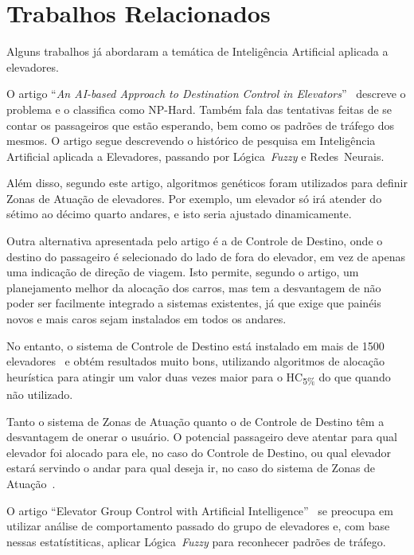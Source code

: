 \chapter{\label{chap:related}Trabalhos Relacionados}

Alguns trabalhos já abordaram a temática de Inteligência Artificial aplicada a
elevadores. %

O artigo ``\textit{An AI-based Approach to Destination Control in
  Elevators}''~\cite{KOEHLEROTTIGER02} descreve o problema e o classifica como
NP-Hard. Também fala das tentativas feitas de se contar os passageiros que estão
esperando, bem como os padrões de tráfego dos mesmos. O artigo segue descrevendo
o histórico de pesquisa em Inteligência Artificial aplicada a Elevadores,
passando por Lógica~\textit{Fuzzy} e Redes~Neurais. 

Além disso, segundo este artigo, algoritmos genéticos foram utilizados para definir Zonas de
Atuação de elevadores. Por exemplo, um elevador só irá atender do sétimo ao
décimo quarto andares, e isto seria ajustado dinamicamente.

Outra alternativa apresentada pelo artigo é a de Controle de Destino, onde o
destino do passageiro é selecionado do lado de fora do elevador, em vez de
apenas uma indicação de direção de viagem. Isto permite, segundo o artigo, um
planejamento melhor da alocação dos carros, mas tem a desvantagem de não poder
ser facilmente integrado a sistemas existentes, já que exige que painéis novos e
mais caros sejam instalados em todos os andares.

No entanto, o sistema de Controle de Destino está instalado em mais de 1500
elevadores~\cite{KOEHLEROTTIGER02} e obtém resultados muito bons, utilizando
algoritmos de alocação heurística para atingir um valor duas vezes maior para o
HC\textsubscript{5\%} do que quando não utilizado.

Tanto o sistema de Zonas de Atuação quanto o de Controle de Destino têm a
desvantagem de onerar o usuário. O potencial passageiro deve atentar para qual
elevador foi alocado para ele, no caso do Controle de Destino, ou qual elevador
estará servindo o andar para qual deseja ir, no caso do sistema de Zonas de Atuação~\cite{KOEHLEROTTIGER02}.

O artigo ``Elevator Group Control with Artificial Intelligence''~\cite{marja97}
se preocupa em utilizar análise de comportamento passado do grupo de elevadores
e, com base nessas estatístiticas, aplicar Lógica~\textit{Fuzzy} para reconhecer
padrões de tráfego.

